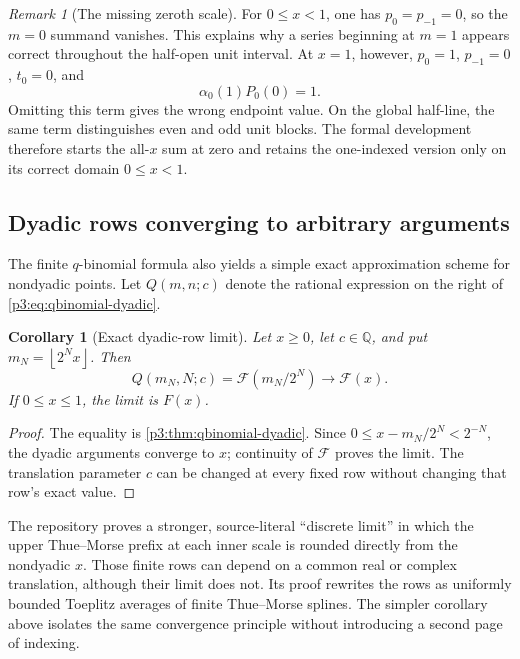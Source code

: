 \documentclass[11pt]{article}
\numberwithin{equation}{section}
\newtheorem{corollary}[theorem]{Corollary}
\theoremstyle{definition}
\theoremstyle{remark}
\newtheorem{remark}[theorem]{Remark}
\newcommand{\Q}{\mathbb Q}
\newcommand{\GF}{\mathcal F}
\newcommand{\floor}[1]{\left\lfloor#1\right\rfloor}
\begin{document}
\begin{remark}[The missing zeroth scale]\label{p3:rem:missing-zero-scale}
For $0\le x<1$, one has $p_0=p_{-1}=0$, so the $m=0$ summand vanishes.  This
explains why a series beginning at $m=1$ appears correct throughout the
half-open unit interval.  At $x=1$, however,
$p_0=1$, $p_{-1}=0$, $t_0=0$, and
\begin{equation}\label{p3:eq:zero-scale-at-one}
 \alpha_0(1)P_0(0)=1.
\end{equation}
Omitting this term gives the wrong endpoint value.  On the global half-line,
the same term distinguishes even and odd unit blocks.  The formal development
therefore starts the all-$x$ sum at zero and retains the one-indexed version
only on its correct domain $0\le x<1$.
\end{remark}

\subsection{Dyadic rows converging to arbitrary arguments}

The finite $q$-binomial formula also yields a simple exact approximation
scheme for nondyadic points.  Let $Q(m,n;c)$ denote the rational expression on
the right of \eqref{p3:eq:qbinomial-dyadic}.

\begin{corollary}[Exact dyadic-row limit]\label{p3:cor:dyadic-row-limit}
Let $x\ge0$, let $c\in\Q$, and put $m_N=\floor{2^Nx}$.  Then
\begin{equation}\label{p3:eq:dyadic-row-limit}
 Q(m_N,N;c)=\GF(m_N/2^N)\longrightarrow\GF(x).
\end{equation}
If $0\le x\le1$, the limit is $F(x)$.
\end{corollary}

\begin{proof}
The equality is \cref{p3:thm:qbinomial-dyadic}.  Since
$0\le x-m_N/2^N<2^{-N}$, the dyadic arguments converge to $x$; continuity of
$\GF$ proves the limit.  The translation parameter $c$ can be changed at
every fixed row without changing that row's exact value.
\end{proof}

The repository proves a stronger, source-literal ``discrete limit'' in which
the upper Thue--Morse prefix at each inner scale is rounded directly from the
nondyadic $x$.  Those finite rows can depend on a common real or complex
translation, although their limit does not.  Its proof rewrites the rows as
uniformly bounded Toeplitz averages of finite Thue--Morse splines.  The
simpler corollary above isolates the same convergence principle without
introducing a second page of indexing.
\end{document}
